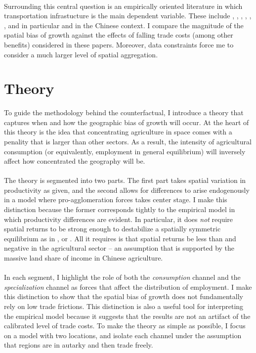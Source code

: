 \documentclass[]{article}
\begin{document}
\paragraph*{}
Surrounding this central question is an empirically oriented literature in which transportation infrastucture is the main dependent variable. These include \citet{baumsnow2007}, \citet{durturner}, \citet{durturnerurb}, \citet{bs2020}, \citet{herzog2021}, \citet{faberb}, \citet{bart2018} and in particular \cite{bsetal2017} and \cite{bsetal2020} in the Chinese context. I compare the magnitude of the spatial bias of growth against the effects of falling trade costs (among other benefits) considered in these papers. Moreover, data constraints force me to consider a much larger level of spatial aggregation. 

\section{Theory}
\paragraph*{}
To guide the methodology behind the counterfactual, I introduce a theory that captures when and how the geographic bias of growth will occur. At the heart of this theory is the idea that concentrating agriculture in space comes with a penality that is larger than other sectors. As a result, the intensity of agricultural consumption (or equivalently, employment in general equilibrium) will inversely affect how concentrated the geography will be. 
\paragraph*{}
The theory is segmented into two parts. The first part takes spatial variation in productivity as given, and the second allows for differences to arise endogenously in a model where pro-agglomeration forces takes center stage. I make this distinction because the former corresponds tightly to the empirical model in which productivity differences are evident. In particular, it does \textit{not} require spatial returns to be strong enough to destabilize a spatially symmetric equilibrium as in \citet{krugman1991}, \citet{PUGA1999} or \citet{MURATA2008}. All it requires is that spatial returns be less than and negative in the agricultural sector -- an assumption that is supported by the massive land share of income in Chinese agriculture.
\paragraph*{}
In each segment, I highlight the role of both the \textit{consumption} channel and the \textit{specialization} channel as forces that affect the distribution of employment. I make this distinction to show that the spatial bias of growth does not fundamentally rely on low trade frictions. This distinction is also a useful tool for interpreting the empirical model because it suggests that the results are not an artifact of the calibrated level of trade costs. To make the theory as simple as possible, I focus on a model with two locations, and isolate each channel under the assumption that regions are in autarky and then trade freely.
\end{document}
